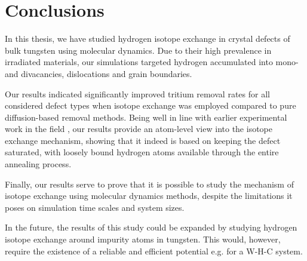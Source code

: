 \chapter{Conclusions}

In this thesis, we have studied hydrogen isotope exchange in crystal defects of bulk tungsten using molecular dynamics. 
Due to their high prevalence in irradiated materials, our simulations targeted hydrogen accumulated into mono- and divacancies, dislocations and grain boundaries.  

Our results indicated significantly improved tritium removal rates for all considered defect types when isotope exchange was employed compared to pure diffusion-based removal methods.
Being well in line with earlier experimental work in the field \cite{ahlgren2019hydrogen}, our results provide an atom-level view into the isotope exchange mechanism, showing that it indeed is based on keeping the defect saturated, with loosely bound hydrogen atoms available through the entire annealing process.


Finally, our results serve to prove that it is possible to study the mechanism of isotope exchange using molecular dynamics methods, despite the limitations it poses on simulation time scales and system sizes.

In the future, the results of this study could be expanded by studying hydrogen isotope exchange around impurity atoms in tungsten.
This would, however, require the existence of a reliable and efficient potential e.g. for a W-H-C system.   
